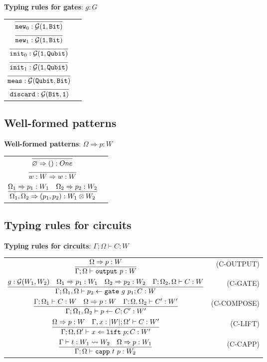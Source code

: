 \documentclass[12pt]{article}
\begin{document}
\noindent \textbf{Typing rules for gates}: $\boxed{g : G}$
\renewcommand\arraystretch{2.5}
\begin{longtable}[c]{cr}
  $ \infer{\new_0 : \calG(\One, \Bit)}{}$ & \\
  $ \infer{\new_1 : \calG(\One, \Bit)}{}$ & \\
  $ \infer{\init_0 : \calG(\One, \Qubit)}{}$ & \\
  $ \infer{\init_1 : \calG(\One, \Qubit)}{}$ & \\
  $ \infer{\meas : \calG(\Qubit, \Bit)}{}$ & \\
  $ \infer{\discard : \calG(\Bit, \One)}{}$ & \\
\end{longtable}

\subsection{Well-formed patterns}

\noindent \textbf{Well-formed patterns}: $\boxed{\Omega \Rightarrow p : W}$

\renewcommand\arraystretch{2.5}
\begin{longtable}[c]{cr}
  $ \infer{\varnothing \To ():One}{}$ & \\
  $ \infer{w:W \To w:W}{}$ & \\
  $ \infer{\Omega_1, \Omega_2 \Rightarrow (p_1,p_2):W_1\otimes W_2}{\Omega_1 \To p_1 : W_1  &\Omega_2 \To p_2 : W_2} $ & \\
\end{longtable}

\subsection{Typing rules for circuits}

\noindent \textbf{Typing rules for circuits}: $\boxed{\Gamma;\Omega\vdash C:W}$


\renewcommand\arraystretch{3}
\begin{longtable}[c]{cr}
  $\infer{\Gamma;\Omega\vdash \toutput\ p:W}{\Omega\To p : W}$ &(C-OUTPUT)\\
  $\infer{\Gamma;\Omega_1,\Omega\vdash p_2 \from \gate\ g\ p_1 ; C:W}{g:\calG(W_1, W_2) &\Omega_1\To p_1:W_1 &\Omega_2\To p_2:W_2 &\Gamma ; \Omega_2,\Omega \vdash C:W}$ &(C-GATE)\\
  $\infer{\Gamma;\Omega_1,\Omega_2\vdash p \from C ; C':W'}{\Gamma;\Omega_1\vdash C:W &\Omega \To p:W &\Gamma;\Omega,\Omega_2 \vdash C':W'}$ &(C-COMPOSE)\\
  $\infer{\Gamma;\Omega,\Omega'\vdash x \From \lift\ p ; C:W'}{\Omega\To p:W &\Gamma,x:|W|;\Omega' \vdash C:W'}$ &(C-LIFT)\\
  $\infer{\Gamma;\Omega\vdash \capp\ t\ p : W_2}{\Gamma\vdash t:W_1\leadsto W_2 &\Omega\To p:W_1}$ &(C-CAPP)\\
\end{longtable}
\end{document}
